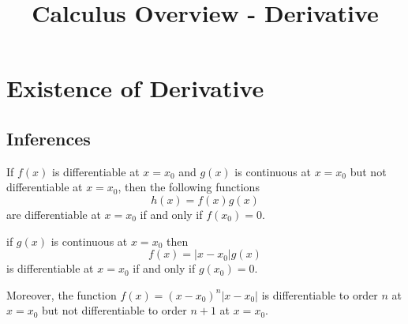 \documentclass{overview}
\title{Calculus Overview - Derivative}
\begin{document}
\maketitle

\section{Existence of Derivative}

\subsection{Inferences}

\begin{theorem} \label{thm:diff_mult_cont}
If $f(x)$ is differentiable at $x =  x_0$ and $g(x)$ is continuous at $x = x_0$
but not differentiable at $x = x_0$, then the following functions
 \[
	h(x) = f(x)g(x)
\] 
are differentiable at $x = x_0$ if and only if $f(x_0) = 0$.
\end{theorem}
\begin{theorem}
	
	if $g(x)$ is continuous at $x = x_0$ then
	\[
		f(x) = |x-x_0|g(x)
	\] 
	is differentiable at $x = x_0$ if and only if $g(x_0) = 0$.

	Moreover, the function $f(x) = (x-x_0)^{n}|x-x_0|$ is differentiable to order
	$n$ at $x = x_0$ but not differentiable to order $n+1$ at $x = x_0$.
\end{theorem}
\end{document}
